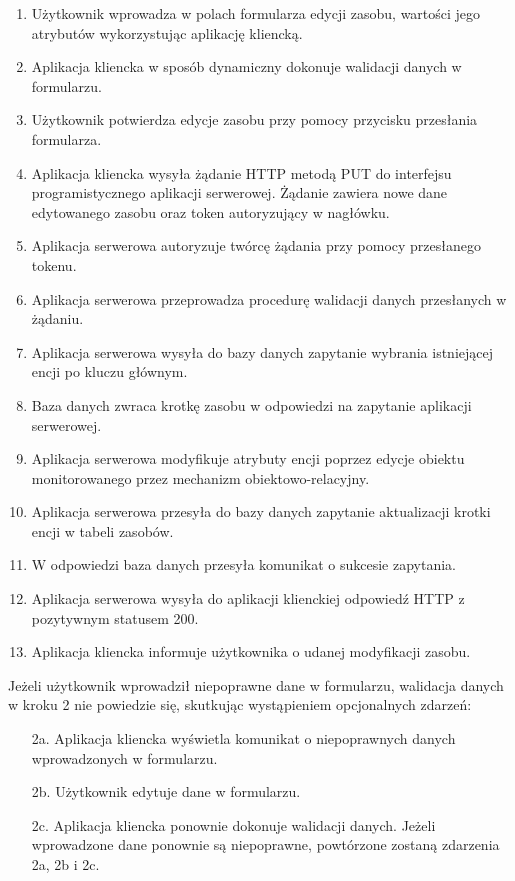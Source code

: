 \begin{enumerate}
    \item Użytkownik wprowadza w polach formularza edycji zasobu, wartości jego atrybutów wykorzystując aplikację kliencką.
    \item Aplikacja kliencka w sposób dynamiczny dokonuje walidacji danych w formularzu.
    \item Użytkownik potwierdza edycje zasobu przy pomocy przycisku przesłania formularza.
    \item Aplikacja kliencka wysyła żądanie HTTP metodą PUT do interfejsu programistycznego aplikacji serwerowej. Żądanie zawiera nowe dane edytowanego zasobu oraz token autoryzujący w nagłówku.
    \item Aplikacja serwerowa autoryzuje twórcę żądania przy pomocy przesłanego tokenu.
    \item Aplikacja serwerowa przeprowadza procedurę walidacji danych przesłanych w żądaniu.
    \item Aplikacja serwerowa wysyła do bazy danych zapytanie wybrania istniejącej encji po kluczu głównym.
    \item Baza danych zwraca krotkę zasobu w odpowiedzi na zapytanie aplikacji serwerowej.
    \item Aplikacja serwerowa modyfikuje atrybuty encji poprzez edycje obiektu monitorowanego przez mechanizm obiektowo-relacyjny.
    \item Aplikacja serwerowa przesyła do bazy danych zapytanie aktualizacji krotki encji w tabeli zasobów.
    \item W odpowiedzi baza danych przesyła komunikat o sukcesie zapytania.
    \item Aplikacja serwerowa wysyła do aplikacji klienckiej odpowiedź HTTP z pozytywnym statusem 200. 
    \item Aplikacja kliencka informuje użytkownika o udanej modyfikacji zasobu.
\end{enumerate}

Jeżeli użytkownik wprowadził niepoprawne dane w formularzu, walidacja danych w kroku 2 nie powiedzie się, skutkując wystąpieniem opcjonalnych zdarzeń:

\begin{enumerate}
    \item [2a.] Aplikacja kliencka wyświetla komunikat o niepoprawnych danych wprowadzonych w formularzu.
    \item [2b.] Użytkownik edytuje dane w formularzu.
    \item [2c.] Aplikacja kliencka ponownie dokonuje walidacji danych. Jeżeli wprowadzone dane ponownie są niepoprawne, powtórzone zostaną zdarzenia 2a, 2b i 2c.
\end{enumerate}

